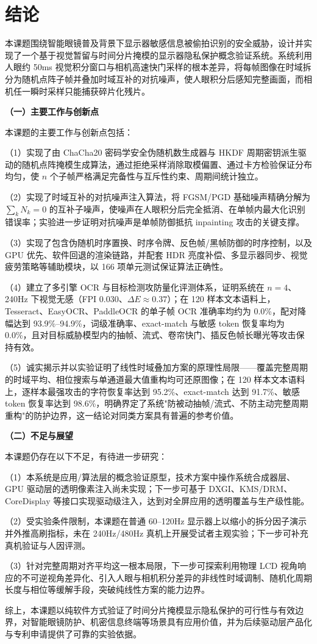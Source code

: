 \chapter*{结\quad 论}

本课题围绕智能眼镜普及背景下显示器敏感信息被偷拍识别的安全威胁，设计并实现了一个基于视觉暂留与时间分片掩模的显示器隐私保护概念验证系统。系统利用人眼约 50ms 视觉积分窗口与相机高速快门采样的根本差异，将每帧图像在时域拆分为随机点阵子帧并叠加时域互补的对抗噪声，使人眼积分后感知完整画面，而相机任一瞬时采样只能捕获碎片化残片。

\noindent\textbf{（一）主要工作与创新点}

本课题的主要工作与创新点包括：

（1）实现了由 ChaCha20 密码学安全伪随机数生成器与 HKDF 周期密钥派生驱动的随机点阵掩模生成算法，通过拒绝采样消除取模偏置、通过卡方检验保证分布均匀，使 $n$ 个子帧严格满足完备性与互斥性约束、周期间统计独立。

（2）实现了时域互补的对抗噪声注入算法，将 FGSM/PGD 基础噪声精确分解为 $\sum_k N_k = 0$ 的互补子噪声，使噪声在人眼积分后完全抵消、在单帧内最大化识别错误率；实验进一步证明对抗噪声是单帧防御抵抗 inpainting 攻击的关键支撑。

（3）实现了包含伪随机时序置换、时序令牌、反色帧/黑帧防御的时序控制，以及 GPU 优先、软件回退的渲染链路，并配套 HDR 亮度补偿、多显示器同步、视觉疲劳策略等辅助模块，以 166 项单元测试保证算法正确性。

（4）建立了多引擎 OCR 与目标检测攻防量化评测体系，证明系统在 $n=4$、240Hz 下视觉无感（FPI 0.030、$\Delta E\approx0.37$）；在 120 样本文本语料上，Tesseract、EasyOCR、PaddleOCR 的单子帧 OCR 准确率均约为 0.0\%，配对降幅达到 93.9\%--94.9\%，词级准确率、exact-match 与敏感 token 恢复率均为 0.0\%，且对目标威胁模型内的抽帧、流式、卷帘快门、插反色帧长曝光等攻击保持有效。

（5）诚实揭示并以实验证明了线性时域叠加方案的原理性局限——覆盖完整周期的时域平均、相位搜索与单通道最大值重构均可还原图像；在 120 样本文本语料上，逐样本最强攻击的字符恢复率达到 95.2\%、exact-match 达到 91.7\%、敏感 token 恢复率达到 98.6\%，明确界定了系统"防被动抽帧/流式、不防主动完整周期重构"的防护边界，这一结论对同类方案具有普遍的参考价值。

\noindent\textbf{（二）不足与展望}

本课题仍存在以下不足，有待进一步研究：

（1）本系统是应用/算法层的概念验证原型，技术方案中操作系统合成器层、GPU 驱动层的透明像素注入尚未实现；下一步可基于 DXGI、KMS/DRM、CoreDisplay 等接口实现驱动级注入，达到对全屏应用的透明覆盖与生产级性能。

（2）受实验条件限制，本课题在普通 60--120Hz 显示器上以缩小的拆分因子演示并外推高刷指标，未在 240Hz/480Hz 真机上开展受试者主观实验；下一步可补充真机验证与人因评测。

（3）针对完整周期对齐平均这一根本局限，下一步可探索利用物理 LCD 视角响应的不可逆视角差异化、引入人眼与相机积分差异的非线性时域调制、随机化周期长度与相位等缓解手段，突破纯线性方案的能力边界。

综上，本课题以纯软件方式验证了时间分片掩模显示隐私保护的可行性与有效边界，对智能眼镜防护、机密信息终端等场景具有应用价值，并为后续驱动层产品化与专利申请提供了可靠的实验依据。

